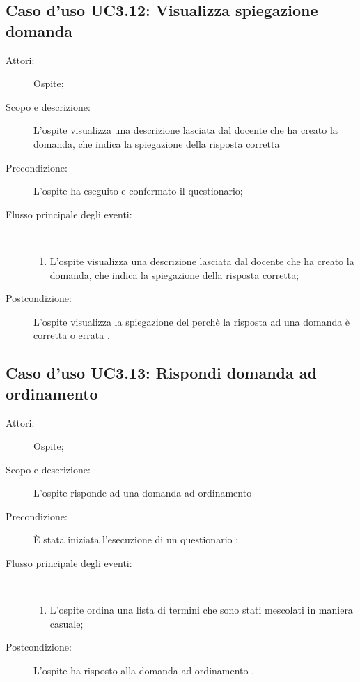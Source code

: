 \subsection{Caso d'uso UC3.12: Visualizza spiegazione domanda}\begin{description}
	\item[Attori:] Ospite;
	\item[Scopo e descrizione:] L'ospite visualizza una descrizione lasciata dal docente che ha creato la domanda, che indica la spiegazione della risposta corretta
	\item[Precondizione:] L'ospite ha eseguito e confermato il questionario;
	
	\item[Flusso principale degli eventi:] \ 
	\begin{enumerate}
		\item L'ospite visualizza una descrizione lasciata dal docente che ha creato la domanda, che indica la spiegazione della risposta corretta;
		
	\end{enumerate}
	\item[Postcondizione:] L'ospite visualizza la spiegazione del perchè la risposta ad una domanda è corretta o errata .
\end{description}
\hypertarget{UC3.13}{}
\subsection{Caso d'uso UC3.13: Rispondi domanda ad ordinamento}\begin{description}
	\item[Attori:] Ospite;
	\item[Scopo e descrizione:] L'ospite risponde ad una domanda ad ordinamento
	
	\item[Precondizione:] È stata iniziata l'esecuzione di un questionario
	;
	
	\item[Flusso principale degli eventi:] \ 
	\begin{enumerate}
		\item L'ospite ordina una lista di termini che sono stati mescolati in maniera casuale;
		
	\end{enumerate}
	\item[Postcondizione:] L'ospite ha risposto alla domanda ad ordinamento
	.
\end{description}
\hypertarget{UC3.14}{}
